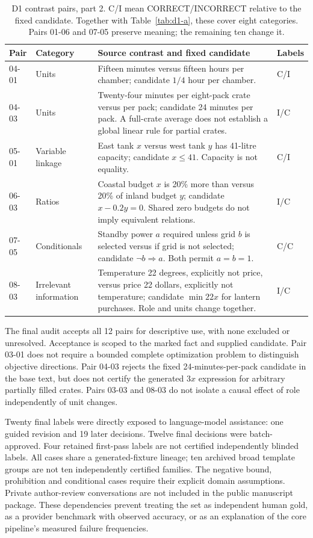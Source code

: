 \begin{table}[htbp]\centering\small
\caption{D1 contrast pairs, part 2. C/I mean CORRECT/INCORRECT relative to the fixed candidate. Together with Table~\ref{tab:d1-a}, these cover eight categories. Pairs 01-06 and 07-05 preserve meaning; the remaining ten change it.}\label{tab:d1-b}
\renewcommand{\arraystretch}{1.18}
\begin{tabularx}{\linewidth}{@{}l>{\raggedright\arraybackslash}p{2.3cm}Xl@{}}\toprule
Pair & Category & Source contrast and fixed candidate & Labels\\\midrule
04-01 & Units & Fifteen minutes versus fifteen hours per chamber; candidate $1/4$ hour per chamber. & C/I\\[3pt]
04-03 & Units & Twenty-four minutes per eight-pack crate versus per pack; candidate 24 minutes per pack. A full-crate average does not establish a global linear rule for partial crates. & I/C\\[3pt]
05-01 & Variable linkage & East tank $x$ versus west tank $y$ has 41-litre capacity; candidate $x\leq41$. Capacity is not equality. & C/I\\[3pt]
06-03 & Ratios & Coastal budget $x$ is 20\% more than versus 20\% of inland budget $y$; candidate $x-0.2y=0$. Shared zero budgets do not imply equivalent relations. & I/C\\[3pt]
07-05 & Conditionals & Standby power $a$ required unless grid $b$ is selected versus if grid is not selected; candidate $\neg b\Rightarrow a$. Both permit $a=b=1$. & C/C\\[3pt]
08-03 & Irrelevant information & Temperature 22 degrees, explicitly not price, versus price 22 dollars, explicitly not temperature; candidate $\min22x$ for lantern purchases. Role and units change together. & I/C\\\bottomrule
\end{tabularx}\end{table}

The final audit accepts all 12 pairs for descriptive use, with none excluded or unresolved. Acceptance is scoped to the marked fact and supplied candidate. Pair 03-01 does not require a bounded complete optimization problem to distinguish objective directions. Pair 04-03 rejects the fixed 24-minutes-per-pack candidate in the base text, but does not certify the generated $3x$ expression for arbitrary partially filled crates. Pairs 03-03 and 08-03 do not isolate a causal effect of role independently of unit changes.

Twenty final labels were directly exposed to language-model assistance: one guided revision and 19 later decisions. Twelve final decisions were batch-approved. Four retained first-pass labels are not certified independently blinded labels. All cases share a generated-fixture lineage; ten archived broad template groups are not ten independently certified families. The negative bound, prohibition and conditional cases require their explicit domain assumptions. Private author-review conversations are not included in the public manuscript package. These dependencies prevent treating the set as independent human gold, as a provider benchmark with observed accuracy, or as an explanation of the core pipeline's measured failure frequencies.

